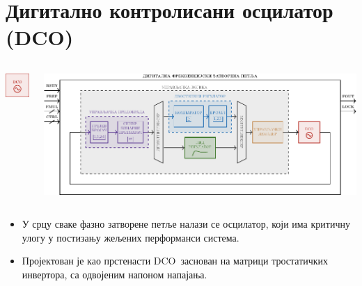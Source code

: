\documentclass[aspectratio=169]{beamer}
\def \DCO  {DCO} %
\begin{document}
\section{Дигитално контролисани осцилатор (\DCO)}
\begin{frame}{\secname}
    \vspace{-0.6cm}
    \begin{columns}[t]
        \begin{column}{0.25\linewidth}
        	\begin{center}
	            \includegraphics[scale=2]{slike/prezentacija/DCO_blk.pdf} 
	        \end{center}
        \end{column}
        \begin{column}{0.75\linewidth}
        	\begin{center}
            	\includegraphics[scale=0.5]{slike/prezentacija/FLL.pdf}
            \end{center}
        \end{column}
    \end{columns}
    \bigskip
    
    \begin{itemize}
	\item У срцу сваке фазно затворене петље налази се осцилатор, који има критичну улогу у постизању жељених перформанси система.
        \medskip
        \item Пројектован је као прстенасти \DCO\ заснован на матрици тростатичких инвертора, са одвојеним напоном напајања.
    \end{itemize}
\end{frame}
\end{document}

